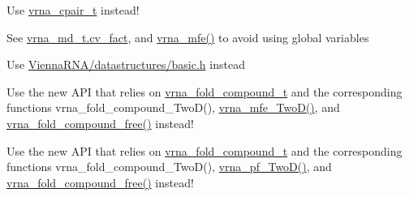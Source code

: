 \begin{DoxyRefList}
\item[Global \mbox{\hyperlink{group__data__structures_ga8412f116a2eb07b59ade9e14ca7c5ef1}{cpair}} ]\label{deprecated__deprecated000214}%
%
Use \mbox{\hyperlink{group__data__structures_gae4fc91141cc69c6d8eaf1332cb991ecc}{vrna\+\_\+cpair\+\_\+t}} instead!  
\item[Global \mbox{\hyperlink{alifold_8h_af3cbac6ff5d706d6e414677841ddf94c}{cv\+\_\+fact}} ]\label{deprecated__deprecated000016}%
%
See \mbox{\hyperlink{group__model__details_a62ebefb9d0643e5c4c8a2ec84a105ce6}{vrna\+\_\+md\+\_\+t.\+cv\+\_\+fact}}, and \mbox{\hyperlink{group__mfe__global_gabd3b147371ccf25c577f88bbbaf159fd}{vrna\+\_\+mfe()}} to avoid using global variables 
\item[File \mbox{\hyperlink{data__structures_8h}{data\+\_\+structures.h}} ]\label{deprecated__deprecated000046}%
%
Use \mbox{\hyperlink{datastructures_2basic_8h}{Vienna\+R\+N\+A/datastructures/basic.\+h}} instead  
\item[Global \mbox{\hyperlink{group__kl__neighborhood__mfe_ga05bf4f31d216b1b160fd2d3d68e9b487}{destroy\+\_\+\+Two\+Dfold\+\_\+variables}} (\mbox{\hyperlink{group__kl__neighborhood__mfe_structTwoDfold__vars}{Two\+Dfold\+\_\+vars}} $\ast$our\+\_\+variables)]\label{deprecated__deprecated000003}%
%
Use the new A\+PI that relies on \mbox{\hyperlink{group__fold__compound_ga1b0cef17fd40466cef5968eaeeff6166}{vrna\+\_\+fold\+\_\+compound\+\_\+t}} and the corresponding functions vrna\+\_\+fold\+\_\+compound\+\_\+\+Two\+D(), \mbox{\hyperlink{group__kl__neighborhood__mfe_ga243c288b463147352829df04de6a2f77}{vrna\+\_\+mfe\+\_\+\+Two\+D()}}, and \mbox{\hyperlink{group__fold__compound_ga576a077b418a9c3650e06f8e5d296fc2}{vrna\+\_\+fold\+\_\+compound\+\_\+free()}} instead! 
\item[Global \mbox{\hyperlink{2Dpfold_8h_afe994291458ee2ac34d3eb825ef62a15}{destroy\+\_\+\+Two\+Dpfold\+\_\+variables}} (\mbox{\hyperlink{structTwoDpfold__vars}{Two\+Dpfold\+\_\+vars}} $\ast$vars)]\label{deprecated__deprecated000008}%
%
Use the new A\+PI that relies on \mbox{\hyperlink{group__fold__compound_ga1b0cef17fd40466cef5968eaeeff6166}{vrna\+\_\+fold\+\_\+compound\+\_\+t}} and the corresponding functions vrna\+\_\+fold\+\_\+compound\+\_\+\+Two\+D(), \mbox{\hyperlink{group__kl__neighborhood__pf_ga0bc3427689bd09da09b8b3094a27f836}{vrna\+\_\+pf\+\_\+\+Two\+D()}}, and \mbox{\hyperlink{group__fold__compound_ga576a077b418a9c3650e06f8e5d296fc2}{vrna\+\_\+fold\+\_\+compound\+\_\+free()}} instead! 

\end{DoxyRefList}
